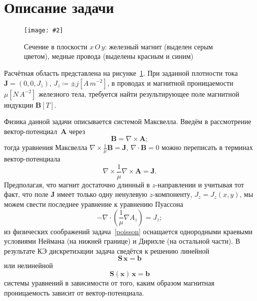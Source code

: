 \documentclass[a4paper, 14pt]{extarticle}
\newcommand{\includegraphicsw}[2][1.]{\texttt{[image: \#2]}}
\newcommand{\vect}[1]{\boldsymbol{\mathbf{#1}}}
\begin{document}
	
	
	
	
	
	\section{Описание задачи}
	
	\begin{figure}[b!]
		\centering
		\includegraphicsw[.6]{magnet.png}
		\caption{Сечение в плоскости $x\,O\,y$: железный магнит (выделен серым цветом), медные провода (выделены красным и синим)}
		\label{fig:magnet}
	\end{figure}
	
	Расчётная область представлена на рисунке~\ref{fig:magnet}. При заданной плотности тока $\vect J = (0, 0, J_z)$, $J_z \coloneqq \pm j \left[A\,m^{-2}\right]$, в проводах и магнитной проницаемости $\mu \left[N\,A^{-2}\right]$ железного тела, требуется найти результирующее поле магнитной индукции $\vect B \left[T\right]$.
	
	Физика данной задачи описывается системой Максвелла. Введём в рассмотрение вектор-потенциал~$\vect A$ через 
	$$
		\vect B = \nabla\times\vect A;
	$$
	тогда уравнения Максвелла $\nabla\times\frac{1}{\mu} \vect B = \vect J$, $\nabla\cdot\vect B = 0$ можно переписать в терминах вектор-потенциала
	$$
		\nabla\times\frac{1}{\mu}\nabla\times\vect A = \vect J.
	$$
	Предполагая, что магнит достаточно длинный в $z$-направлении и учитывая тот факт, что поле $\vect J$ имеет только одну ненулевую $z$-компоненту, $J_z = J_z(x, y)$, мы можем свести последнее уравнение к уравнению Пуассона
	\begin{equation}\label{poisson}
		-\nabla\cdot(\frac{1}{\mu}\nabla A_z) = J_z;
	\end{equation}
	из физических соображений задача~\eqref{poisson} оснащается однородными краевыми условиями Неймана (на нижней границе) и Дирихле (на остальной части). В результате КЭ дискретизации задача сведётся к решению линейной
	\begin{equation}\label{linear}
		\vect S\,\vect x = \vect b
	\end{equation}
	или нелинейной
	\begin{equation}\label{nonlinear}
		\vect S(\vect x)\,\vect x = \vect b
	\end{equation}
	системы уравнений в зависимости от того, каким образом магнитная проницаемость зависит от вектор-потенциала. 
	
\end{document}
